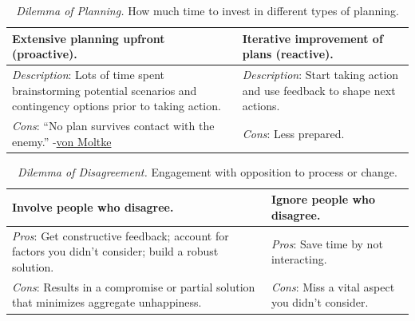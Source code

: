 \begin{center}
\begin{table}[H] %
\begin{tabular}{ | m{\dilemmatablewidth}| m{\dilemmatablewidth} | } 
  \hline
  \textbf{Extensive planning upfront (proactive).} & 
  \textbf{Iterative improvement of plans (reactive).} \\ 
  \hline
  \textit{Description}: Lots of time spent brainstorming potential scenarios and contingency options prior to taking action. & 
  \textit{Description}: Start taking action and use feedback to shape next actions. \\ 
  \hline
  \textit{Cons}: ``No plan survives contact with the enemy.'' {\small -\href{https://en.wikipedia.org/wiki/Helmuth_von_Moltke_the_Elder}{von Moltke}
  \index{Wikipedia!\href{https://en.wikipedia.org/wiki/Helmuth_von_Moltke_the_Elder}{Helmuth von Moltke}}
  } & 
  \textit{Cons}: Less prepared. \\  
  \hline
\end{tabular}
\caption{
\textit{Dilemma of Planning.}
How much time to invest in different types of planning.
}
\label{table:planning}
\end{table}
\end{center}



\begin{center}
\begin{table}[H]
\begin{tabular}{ | m{\dilemmatablewidth}| m{\dilemmatablewidth} | } 
  \hline
  \textbf{Involve people who disagree.} & 
  \textbf{Ignore people who disagree.} \\ 
  \hline
  \textit{Pros}: Get constructive feedback; account for factors you didn't consider; build a robust solution. & 
  \textit{Pros}: Save time by not interacting. \\  
  \hline
  \textit{Cons}: Results in a compromise or partial solution that minimizes aggregate unhappiness. & 
  \textit{Cons}: Miss a vital aspect you didn't consider. \\  
  \hline
\end{tabular}
\caption{\textit{Dilemma of Disagreement.}
Engagement with opposition to process or change.
}
\label{table:opposition}
\end{table}
\end{center}


